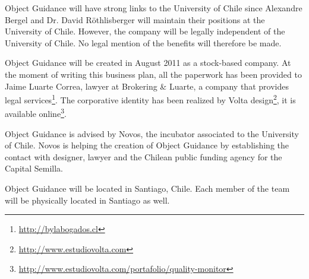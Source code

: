 \documentclass[runningheads]{llncs}
\begin{document}
Object Guidance will have strong links to the University of Chile since Alexandre Bergel and Dr. David R\"othlisberger will maintain their positions at the University of Chile. However, the company will be legally independent of the University of Chile. No legal mention of the benefits will therefore be made. 

Object Guidance will be created in August 2011 as a stock-based company. At the moment of writing this business plan, all the paperwork has been provided to Jaime Luarte Correa, lawyer at Brokering \& Luarte, a company that provides legal services\footnote{\url{http://bylabogados.cl}}. The corporative identity has been realized by Volta design\footnote{\url{http://www.estudiovolta.com}}, it is available online\footnote{\url{http://www.estudiovolta.com/portafolio/quality-monitor}}.

Object Guidance is advised by Novos, the incubator associated to the University of Chile. Novos is helping the creation of Object Guidance by establishing the contact with designer, lawyer and the Chilean public funding agency for the Capital Semilla.

Object Guidance will be located in Santiago, Chile. Each member of the team will be physically located in Santiago as well.


\end{document}
